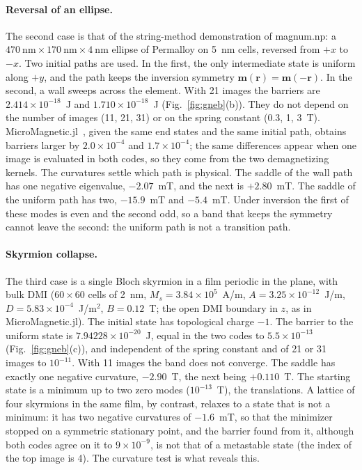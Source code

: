 \documentclass{article}      %
\newcommand{\vm}{\bm{m}}
\begin{document}
\paragraph{Reversal of an ellipse.}
The second case is that of the string-method demonstration of magnum.np: a
$470~\mathrm{nm}\times170~\mathrm{nm}\times4~\mathrm{nm}$ ellipse of Permalloy on 5~nm
cells, reversed from $+x$ to $-x$. Two initial paths are used. In the first, the only
intermediate state is uniform along $+y$, and the path keeps the inversion symmetry
$\vm(\bm{r})=\vm(-\bm{r})$. In the second, a wall sweeps across the element. With 21 images
the barriers are $2.414\times10^{-18}$~J and $1.710\times10^{-18}$~J
(Fig.~\ref{fig:gneb}(b)). They do not depend on the number of images (11, 21, 31) or on the
spring constant (0.3, 1, 3~T). MicroMagnetic.jl~\cite{wang2024}, given the same end states
and the same initial path, obtains barriers larger by $2.0\times10^{-4}$ and
$1.7\times10^{-4}$; the same differences appear when one image is evaluated in both codes,
so they come from the two demagnetizing kernels. The curvatures settle which path is
physical. The saddle of the wall path has one negative eigenvalue,
$-2.07$~mT, and the next is $+2.80$~mT. The saddle of the uniform path has two, $-15.9$~mT
and $-5.4$~mT. Under inversion the first of these modes is even and the second odd, so a
band that keeps the symmetry cannot leave the second: the uniform path is not a
transition path.

\paragraph{Skyrmion collapse.}
The third case is a single Bloch skyrmion in a film periodic in the plane, with bulk DMI
($60\times60$ cells of 2~nm, $M_s=3.84\times10^5$~A/m, $A=3.25\times10^{-12}$~J/m,
$D=5.83\times10^{-4}$~J/m$^2$, $B=0.12$~T; the open DMI boundary in $z$, as in
MicroMagnetic.jl). The initial state has topological charge $-1$. The barrier to the
uniform state is $7.94228\times10^{-20}$~J, equal in the two codes to $5.5\times10^{-13}$
(Fig.~\ref{fig:gneb}(c)), and independent of the spring constant and of 21 or 31 images to
$10^{-11}$. With 11 images the band does not converge. The saddle has exactly one negative
curvature, $-2.90$~T, the next being $+0.110$~T. The starting state is a minimum up to
two zero modes ($10^{-13}$~T), the translations. A lattice of four
skyrmions in the same film, by contrast, relaxes to a state that is not a minimum: it has
two negative curvatures of $-1.6$~mT, so that the minimizer stopped on a
symmetric stationary point, and the barrier found from it, although both codes agree on it
to $9\times10^{-9}$, is not that of a metastable state (the index of the top image is 4).
The curvature test is what reveals this.
\end{document}

